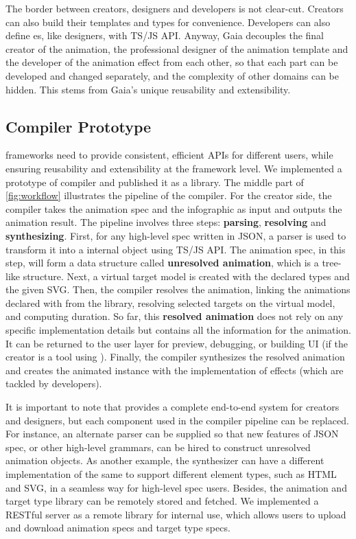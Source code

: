 The border between creators, designers and developers is not clear-cut. Creators can also build their templates and types for convenience. 
Developers can also define \aniclass{}es, like designers, with TS/JS API.
Anyway, Gaia decouples the final creator of the animation, the professional designer of the animation template and the developer of the animation effect from each other, so that each part can be developed and changed separately, and the complexity of other domains can be hidden. 
This stems from Gaia's unique reusability and extensibility.


\subsection{\gaia{} Compiler Prototype}
\label{ssec:compiler}

\gaia{} frameworks need to provide consistent, efficient APIs for different users, while ensuring reusability and extensibility at the framework level.
We implemented a prototype of \gaia{} compiler and published it as a library.
The middle part of \autoref{fig:workflow} illustrates the pipeline of the compiler.
For the creator side, the compiler takes the animation spec and the infographic as input and outputs the animation result.
The pipeline involves three steps: \textbf{parsing}, \textbf{resolving} and \textbf{synthesizing}. 
First, for any high-level spec written in JSON, a parser is used to transform it into a \gaia{} internal object using TS/JS API.
The animation spec, in this step, will form a data structure called \textbf{unresolved animation}, which is a tree-like structure.
Next, a virtual target model is created with the declared types and the given SVG.
Then, the compiler resolves the animation, linking the animations declared with  from the library, resolving selected targets on the virtual model, and computing duration.
So far, this \textbf{resolved animation} does not rely on any specific implementation details but contains all the information for the animation.
It can be returned to the user layer for preview, debugging, or building UI (if the creator is a tool using \gaia{}).
Finally, the compiler synthesizes the resolved animation and creates the animated instance with the implementation of effects (which are tackled by developers).

It is important to note that \gaia{} provides a complete end-to-end system for creators and designers, but each component used in the compiler pipeline can be replaced.
For instance, an alternate parser can be supplied so that new features of JSON spec, or other high-level grammars, can be hired to construct unresolved animation objects.
As another example, the synthesizer can have a different implementation of the same \aniclass{} to support different element types, such as HTML and SVG, in a seamless way for high-level spec users.
Besides, the animation and target type library can be remotely stored and fetched.
We implemented a RESTful server as a remote library for internal use, which allows users to upload and download animation specs and target type specs.
